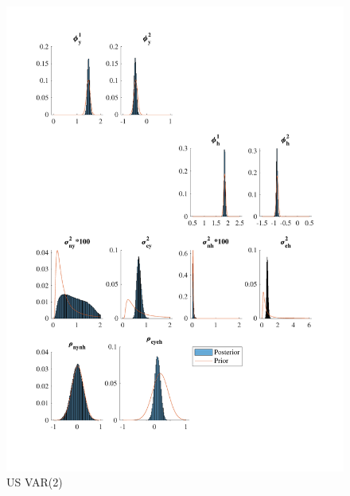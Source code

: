 \documentclass[
  12pt,
]{article}
\begin{document}
\begin{figure}

{\centering \includegraphics[width=0.85\linewidth]{../../Regression/Bayesian_UC_VAR2_drift/OutputData/posteriorpriordistribution_US} 

}

\caption{US VAR(2)}\label{fig:unnamed-chunk-12}
\end{figure}
\end{document}
